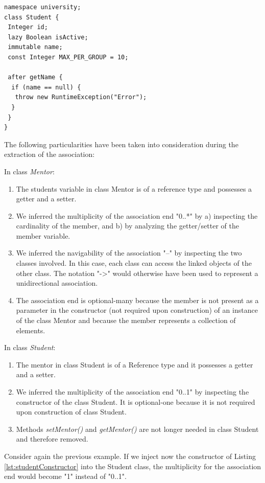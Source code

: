 \begin{lstlisting}[style=umpleOut,caption=Student.ump,label=lst:studentUmple2]
namespace university;
class Student {
 Integer id; 
 lazy Boolean isActive; 
 immutable name; 
 const Integer MAX_PER_GROUP = 10; 
 
 after getName {
  if (name == null) { 
   throw new RuntimeException("Error");
  }
 }
}
\end{lstlisting}

The following particularities have been taken into consideration during the extraction of the association:

In class \textit{Mentor}:
\begin{enumerate}
\item The students variable in class Mentor is of a reference type and possesses a getter and a setter.
\item We inferred the multiplicity of the association end "0..*" by a) inspecting the cardinality of the member, and b) by analyzing the getter/setter of the member variable.
\item We inferred the navigability of the association "--" by inspecting the two classes involved. In this case, each class can access the linked objects of the other class.  The notation "->" would otherwise have been used to represent a unidirectional association. 
\item The association end is optional-many because the member is not present as a parameter in the constructor (not required upon construction) of an instance of the class Mentor and because the member represents a collection of elements. 
\end{enumerate}

In class \textit{Student}:
\begin{enumerate}

\item The mentor in class Student is of a Reference type and it possesses a getter and a setter.
\item We inferred the multiplicity of the association end "0..1" by inspecting the constructor of the class Student. It is optional-one because it is not required upon construction of class Student. 
\item Methods \textit{setMentor()} and \textit{getMentor()} are not longer needed in class Student and therefore removed.
\end{enumerate}

Consider again the previous example.  If we inject now the constructor of Listing \ref{lst:studentConstructor} into the Student class, the multiplicity for the association end would become "1" instead of "0..1". 

